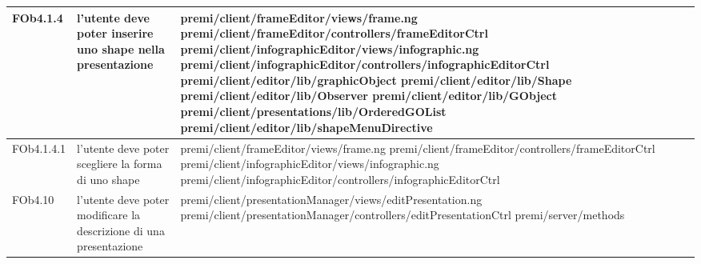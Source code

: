 \begin{longtable}{|l|p{5cm}|p{7cm}|}
FOb4.1.4 & l'utente deve poter inserire uno shape nella presentazione & \hspace{0pt}premi/client/frameEditor/views/frame.ng \linebreak \linebreak premi/client/frameEditor/controllers/frameEditorCtrl \linebreak \linebreak premi/client/infographicEditor/views/infographic.ng \linebreak \linebreak premi/client/infographicEditor/controllers/infographicEditorCtrl \linebreak \linebreak premi/client/editor/lib/graphicObject \linebreak \linebreak premi/client/editor/lib/Shape  \linebreak \linebreak \linebreak \linebreak premi/client/editor/lib/Observer premi/client/editor/lib/GObject \linebreak \linebreak premi/client/presentations/lib/OrderedGOList \linebreak \linebreak premi/client/editor/lib/shapeMenuDirective \\
\hline
FOb4.1.4.1 & l'utente deve poter scegliere la forma di uno shape & \hspace{0pt}premi/client/frameEditor/views/frame.ng \linebreak \linebreak premi/client/frameEditor/controllers/frameEditorCtrl \linebreak \linebreak premi/client/infographicEditor/views/infographic.ng \linebreak \linebreak premi/client/infographicEditor/controllers/infographicEditorCtrl \\
\hline
FOb4.10 & l'utente deve poter modificare la descrizione di una presentazione &\hspace{0pt}premi/client/presentationManager/views/editPresentation.ng \linebreak \linebreak premi/client/presentationManager/controllers/editPresentationCtrl  \linebreak \linebreak premi/server/methods \\

\end{longtable}
